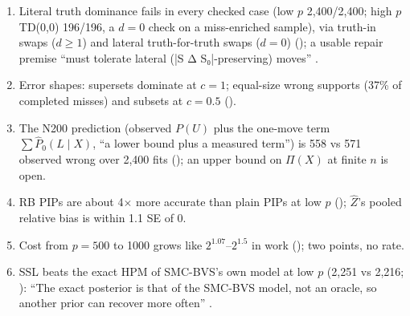 \begin{agentnote}
\begin{enumerate}
.
\item Literal truth dominance fails in every checked case (low $p$ 2,400/2,400; high $p$ TD(0,0) 196/196, a $d=0$ check on a miss-enriched sample), via truth-in swaps ($d\ge1$) and lateral
truth-for-truth swaps ($d=0$) (); a usable repair premise ``must tolerate lateral (|S Δ S₀|-preserving) moves''
.
\item Error shapes: supersets dominate at $c=1$; equal-size wrong supports (37\% of completed misses) and subsets at $c=0.5$ ().
\item The N200 prediction (observed $P(U)$ plus the one-move term $\sum\hat P_0(L\mid X)$, ``a lower bound plus a measured term'') is 558 vs 571 observed wrong over 2,400 fits (); an upper bound on $\Pi(X)$ at finite $n$ is open.
\item RB PIPs are about 4$\times$ more accurate than plain PIPs at low $p$ (); $\hat Z$'s pooled relative bias is within 1.1 SE of 0.
\item Cost from $p=500$ to 1000 grows like $2^{1.07}$--$2^{1.5}$ in work (); two points, no rate.
\item SSL beats the exact HPM of SMC-BVS's own model at low $p$ (2,251 vs 2,216; ): ``The exact posterior is that of the
SMC-BVS model, not an oracle, so another prior can recover more often''
.
\end{enumerate}
\end{agentnote}
